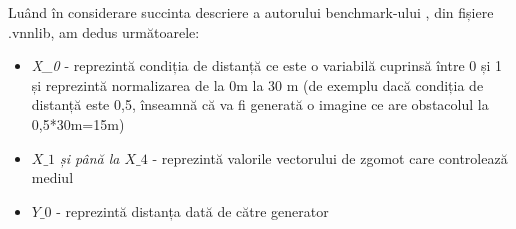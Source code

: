 Luând în considerare succinta descriere a autorului benchmark-ului , din fișiere .vnnlib, am dedus următoarele:

\begin{itemize}
  \item \textit{X\_0} - reprezintă condiția de distanță ce este o variabilă cuprinsă între 0 și 1 și reprezintă normalizarea de la 0m la 30 m (de exemplu dacă condiția de distanță este 0,5, înseamnă că va fi generată o imagine ce are obstacolul la 0,5*30m=15m)
  
  \item \textit{$X\_1$ și până la $X\_4$} - reprezintă valorile vectorului de zgomot care controlează mediul
  
  \item \textit{$Y\_0$}  - reprezintă distanța dată de către generator
  
\end{itemize}